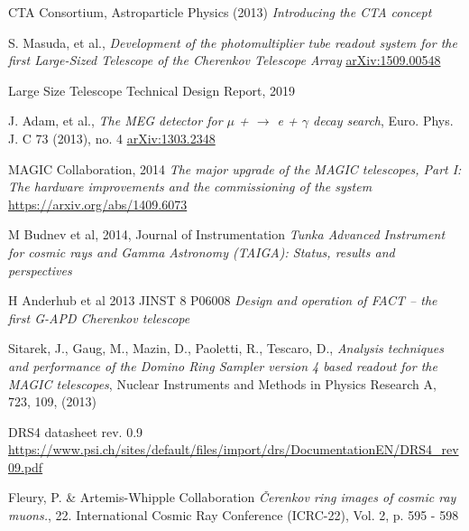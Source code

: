 \documentclass[a4paper,11pt,twoside]{article}
\begin{document}
\begin{thebibliography}{9}
CTA Consortium, Astroparticle Physics (2013)
\textit{Introducing the CTA concept}

S. Masuda, et al., 
\textit{Development of the photomultiplier tube readout
system for the first Large-Sized Telescope of the
Cherenkov Telescope Array}
\url{arXiv:1509.00548}

Large Size Telescope Technical Design Report, 2019

J. Adam, et al.,
\textit{The MEG detector for $\mu$ + $\rightarrow$ e + $\gamma$ decay search}, Euro. Phys. J. C 73 (2013), no. 4
\url{arXiv:1303.2348}

MAGIC Collaboration, 2014
\textit{The major upgrade of the MAGIC telescopes, Part I: The hardware improvements and the commissioning of the system}
\url{https://arxiv.org/abs/1409.6073}

M Budnev et al, 2014, Journal of Instrumentation
\textit{Tunka Advanced Instrument for cosmic rays and Gamma Astronomy (TAIGA): Status, results and perspectives}

H Anderhub et al 2013 JINST 8 P06008
\textit{Design and operation of FACT – the first G-APD
Cherenkov telescope}

Sitarek, J., Gaug, M., Mazin, D., Paoletti, R., Tescaro, D., \textit{Analysis techniques and performance of the Domino Ring Sampler version 4 based readout for the MAGIC
telescopes}, Nuclear Instruments and Methods in Physics Research A, 723, 109, (2013)

DRS4 datasheet rev. 0.9
\url{https://www.psi.ch/sites/default/files/import/drs/DocumentationEN/DRS4_rev09.pdf}

Fleury, P. \& Artemis-Whipple Collaboration
\textit{Čerenkov ring images of cosmic ray muons.},
22. International Cosmic Ray Conference (ICRC-22), Vol. 2, p. 595 - 598

\end{thebibliography}
\end{document}
